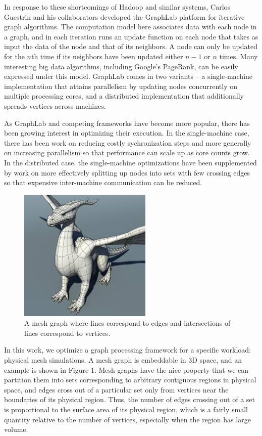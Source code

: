 \documentclass[journal]{IEEEtran}
\begin{document}
In response to these shortcomings of Hadoop and similar systems, Carlos Guestrin and his collaborators developed the GraphLab platform \cite{graphlab} for iterative graph algorithms. The computation model here associates data with each node in a graph, and in each iteration runs an update function on each node that takes as input the data of the node and that of its neighbors. A node can only be updated for the $n$th time if its neighbors have been updated either $n-1$ or $n$ times. Many interesting big data algorithms, including Google's PageRank, can be easily expressed under this model. GraphLab comes in two variants -- a single-machine implementation that attains parallelism by updating nodes concurrently on multiple processing cores, and a distributed implementation that additionally spreads vertices across machines.

As GraphLab and competing frameworks have become more popular, there has been growing interest in optimizing their execution. In the single-machine case, there has been work on reducing costly sychronization steps and more generally on increasing parallelism so that performance can scale up as core counts grow. In the distributed case, the single-machine optimizations have been supplemented by work on more effectively splitting up nodes into sets with few crossing edges so that expensive inter-machine communication can be reduced.

\begin{figure}[!t]
\centering
\includegraphics[width=2.5in]{dragon}
\caption{A mesh graph where lines correspond to edges and intersections of lines correspond to vertices.}
\label{fig_mesh}
\end{figure}

In this work, we optimize a graph processing framework for a specific workload: physical mesh simulations. A mesh graph is embeddable in 3D space, and an example is shown in Figure 1. Mesh graphs have the nice property that we can partition them into sets corresponding to arbitrary contiguous regions in physical space, and edges cross out of a particular set only from vertices near the boundaries of its physical region. Thus, the number of edges crossing out of a set is proportional to the surface area of its physical region, which is a fairly small quantity relative to the number of vertices, especially when the region has large volume.
\end{document}
